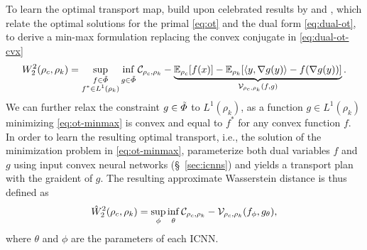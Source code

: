 To learn the optimal transport map, \citeauthor{makkuva2020optimal} build upon celebrated results by \citet{knott1984optimal} and \citet{brenier1991polar}, which relate the optimal solutions for the primal \eqref{eq:ot} and the dual form \eqref{eq:dual-ot}, to derive a min-max formulation replacing the convex conjugate in \eqref{eq:dual-ot-cvx} \citep[Theorem 3.3]{makkuva2020optimal}
\begin{equation} \label{eq:ot-minmax}
    W_{2}^2(\rho_c, \rho_k)=\sup _{\substack{f \in \Tilde{\Phi} \\ f^{*} \in L^{1}(\rho_k)}} \newinf _{g \in \Tilde{\Phi}}  \mathcal{C}_{\rho_c, \rho_k} - \underbrace{\mathbb{E}_{\rho_c}[f(x)]-\mathbb{E}_{\rho_k}[\langle y, \nabla g(y)\rangle-f(\nabla g(y))]}_{\mathcal{V}_{\rho_c, \rho_k}(f, g)}.
\end{equation}
We can further relax the constraint $g \in \Tilde{\Phi}$ to $L^{1}(\rho_k)$, as a function $g \in L^{1}(\rho_k)$ minimizing \eqref{eq:ot-minmax} is convex and equal to $f^*$ for any convex function $f$.
In order to learn the resulting optimal transport, i.e., the solution of the minimization problem in \eqref{eq:ot-minmax}, \citet{makkuva2020optimal} parameterize both dual variables $f$ and $g$ using input convex neural networks (\S~\ref{sec:icnns}) \citep{amos2017input} and yields a transport plan with the graident of $g$.
The resulting approximate Wasserstein distance is thus defined as
\begin{equation} \label{eq:cellot-optim}
    \hat{W}_2^2(\rho_c, \rho_k) = \sup _{\phi} \newinf_{\theta}  \mathcal{C}_{\rho_c, \rho_k} - \mathcal{V}_{\rho_c, \rho_k}(f_{\phi}, g_{\theta}),
\end{equation}
where $\theta$ and $\phi$ are the parameters of each \acrshort{ICNN}.



